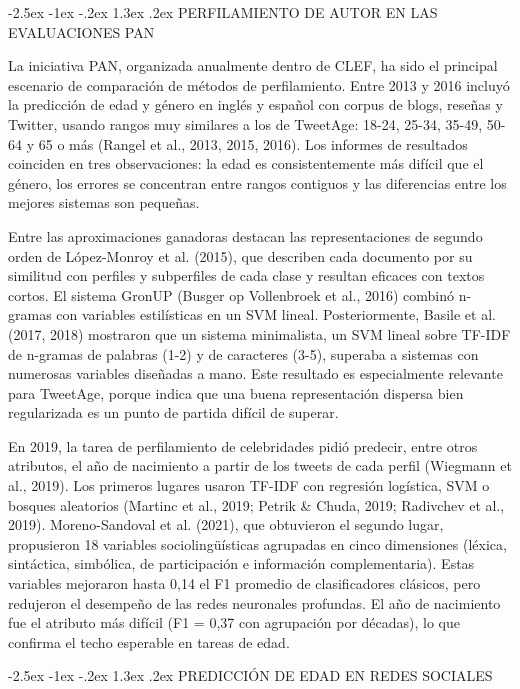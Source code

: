 \documentclass[10pt,twocolumn]{article}
\makeatletter
\renewcommand{\section}{\@startsection{section}{1}{\z@}%
  {-2.5ex \@plus -1ex \@minus -.2ex}%
  {1.3ex \@plus .2ex}%
  {\normalfont\large\bfseries\centering}}
\makeatother
\begin{document}
\section{PERFILAMIENTO DE AUTOR EN LAS EVALUACIONES PAN}\label{sec:3}

La iniciativa PAN, organizada anualmente dentro de CLEF, ha sido el principal escenario de comparación de métodos de perfilamiento. Entre 2013 y 2016 incluyó la predicción de edad y género en inglés y español con corpus de blogs, reseñas y Twitter, usando rangos muy similares a los de TweetAge: 18-24, 25-34, 35-49, 50-64 y 65 o más (Rangel et al., 2013, 2015, 2016). Los informes de resultados coinciden en tres observaciones: la edad es consistentemente más difícil que el género, los errores se concentran entre rangos contiguos y las diferencias entre los mejores sistemas son pequeñas.

Entre las aproximaciones ganadoras destacan las representaciones de segundo orden de López-Monroy et al. (2015), que describen cada documento por su similitud con perfiles y subperfiles de cada clase y resultan eficaces con textos cortos. El sistema GronUP (Busger op Vollenbroek et al., 2016) combinó n-gramas con variables estilísticas en un SVM lineal. Posteriormente, Basile et al. (2017, 2018) mostraron que un sistema minimalista, un SVM lineal sobre TF-IDF de n-gramas de palabras (1-2) y de caracteres (3-5), superaba a sistemas con numerosas variables diseñadas a mano. Este resultado es especialmente relevante para TweetAge, porque indica que una buena representación dispersa bien regularizada es un punto de partida difícil de superar.

En 2019, la tarea de perfilamiento de celebridades pidió predecir, entre otros atributos, el año de nacimiento a partir de los tweets de cada perfil (Wiegmann et al., 2019). Los primeros lugares usaron TF-IDF con regresión logística, SVM o bosques aleatorios (Martinc et al., 2019; Petrik \& Chuda, 2019; Radivchev et al., 2019). Moreno-Sandoval et al. (2021), que obtuvieron el segundo lugar, propusieron 18 variables sociolingüísticas agrupadas en cinco dimensiones (léxica, sintáctica, simbólica, de participación e información complementaria). Estas variables mejoraron hasta 0,14 el F1 promedio de clasificadores clásicos, pero redujeron el desempeño de las redes neuronales profundas. El año de nacimiento fue el atributo más difícil (F1 = 0,37 con agrupación por décadas), lo que confirma el techo esperable en tareas de edad.


\section{PREDICCIÓN DE EDAD EN REDES SOCIALES}\label{sec:4}
\end{document}
